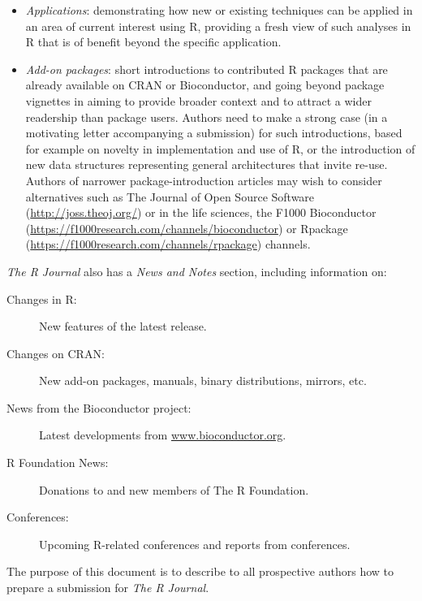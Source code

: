 \documentclass[a4paper]{report}
\begin{document}
\begin{article}
\begin{itemize}
\item \emph{Applications}: demonstrating how new or existing techniques can be applied in an area of current interest using R, providing a fresh view of such analyses in R that is of benefit beyond the specific application.

\item \label{add-on-req}\emph{Add-on packages}: short introductions to contributed R packages that are already available on CRAN or Bioconductor, and going beyond package vignettes in aiming to provide broader context and to attract a wider readership than package users. Authors need to make a strong case (in a motivating letter accompanying a submission) for such introductions, based for example on novelty in implementation and use of R, or the introduction of new data structures representing general architectures that invite re-use. Authors of narrower package-introduction articles may wish to consider alternatives such as The Journal of Open Source Software (\url{http://joss.theoj.org/}) or in the life sciences, the F1000 Bioconductor (\url{https://f1000research.com/channels/bioconductor}) or Rpackage (\url{https://f1000research.com/channels/rpackage}) channels.

\end{itemize}

\noindent
\emph{The R Journal} also has a \emph{News and Notes} section,
including information on:

\begin{description}

\item[Changes in R:] New features of the latest release.

\item[Changes on CRAN:] New add-on packages, manuals, binary distributions,
mirrors, etc.

\item[News from the Bioconductor project:] Latest developments from 
\url{www.bioconductor.org}.

\item[R Foundation News:] Donations to and new members of The R Foundation.

\item[Conferences:] Upcoming R-related conferences and reports from
conferences.

\end{description}

The purpose of this document is to describe to all prospective authors how
to prepare a submission for \emph{The R Journal}.


\end{article}
\end{document}
